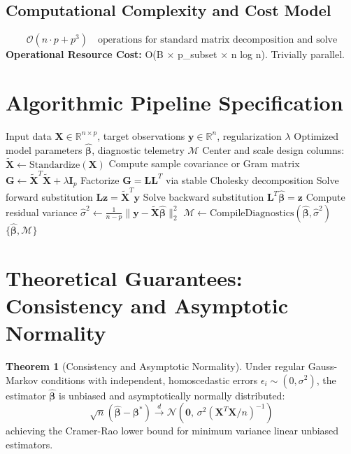 \documentclass[11pt,a4paper]{article}
\theoremstyle{definition}
\newtheorem{theorem}{\textbf{Theorem}}[section]
\begin{document}
\subsection{Computational Complexity and Cost Model}
\begin{equation}
\mathcal{O}(n \cdot p + p^3) \quad \text{operations for standard matrix decomposition and solve}
\end{equation}
\textbf{Operational Resource Cost:} O(B × p\_subset × n log n). Trivially parallel.

\section{Algorithmic Pipeline Specification}

\begin{algorithm}[H]
\caption{Random forest Execution}
\begin{algorithmic}[1]
\Require Input data $\mathbf{X} \in \mathbb{R}^{n \times p}$, target observations $\mathbf{y} \in \mathbb{R}^n$, regularization $\lambda$
\Ensure Optimized model parameters $\hat{\boldsymbol{\beta}}$, diagnostic telemetry $\mathcal{M}$
\State Center and scale design columns: $\tilde{\mathbf{X}} \gets \text{Standardize}(\mathbf{X})$
\State Compute sample covariance or Gram matrix $\mathbf{G} \gets \tilde{\mathbf{X}}^T \tilde{\mathbf{X}} + \lambda \mathbf{I}_p$
\State Factorize $\mathbf{G} = \mathbf{L} \mathbf{L}^T$ via stable Cholesky decomposition
\State Solve forward substitution $\mathbf{L} \mathbf{z} = \tilde{\mathbf{X}}^T \mathbf{y}$
\State Solve backward substitution $\mathbf{L}^T \hat{\boldsymbol{\beta}} = \mathbf{z}$
\State Compute residual variance $\hat{\sigma}^2 \gets \frac{1}{n - p} \| \mathbf{y} - \tilde{\mathbf{X}} \hat{\boldsymbol{\beta}} \|_2^2$
\State $\mathcal{M} \gets \text{CompileDiagnostics}(\hat{\boldsymbol{\beta}}, \hat{\sigma}^2)$
\State \Return $\{\hat{\boldsymbol{\beta}}, \mathcal{M}\}$
\end{algorithmic}
\end{algorithm}

\section{Theoretical Guarantees: Consistency and Asymptotic Normality}

\begin{theorem}[Consistency and Asymptotic Normality]
Under regular Gauss-Markov conditions with independent, homoscedastic errors $\epsilon_i \sim (0, \sigma^2)$, the estimator $\hat{\boldsymbol{\beta}}$ is unbiased and asymptotically normally distributed:
\begin{equation}
\sqrt{n}(\hat{\boldsymbol{\beta}} - \boldsymbol{\beta}^*) \xrightarrow{d} \mathcal{N}\left(\mathbf{0}, \, \sigma^2 (\mathbf{X}^T \mathbf{X} / n)^{-1}\right)
\end{equation}
achieving the Cramer-Rao lower bound for minimum variance linear unbiased estimators.
\end{theorem}
\end{document}
